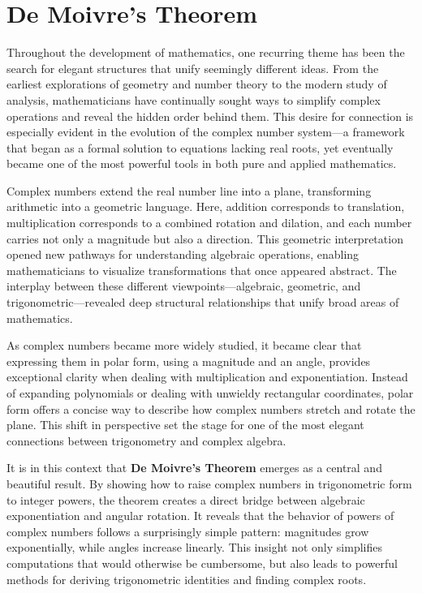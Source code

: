 \chapter{De Moivre's Theorem}

Throughout the development of mathematics, one recurring theme has been the search for elegant structures
that unify seemingly different ideas. From the earliest explorations of geometry and number theory to the
modern study of analysis, mathematicians have continually sought ways to simplify complex operations and
reveal the hidden order behind them. This desire for connection is especially evident in the evolution of
the complex number system—a framework that began as a formal solution to equations lacking real roots, yet
eventually became one of the most powerful tools in both pure and applied mathematics.

Complex numbers extend the real number line into a plane, transforming arithmetic into a geometric
language. Here, addition corresponds to translation, multiplication corresponds to a combined rotation and
dilation, and each number carries not only a magnitude but also a direction. This geometric interpretation
opened new pathways for understanding algebraic operations, enabling mathematicians to visualize
transformations that once appeared abstract. The interplay between these different viewpoints—algebraic,
geometric, and trigonometric—revealed deep structural relationships that unify broad areas of mathematics.

As complex numbers became more widely studied, it became clear that expressing them in polar form, using a
magnitude and an angle, provides exceptional clarity when dealing with multiplication and
exponentiation. Instead of expanding polynomials or dealing with unwieldy rectangular coordinates, polar
form offers a concise way to describe how complex numbers stretch and rotate the plane. This shift in
perspective set the stage for one of the most elegant connections between trigonometry and complex algebra.

It is in this context that {\bf De Moivre's Theorem} emerges as a central and beautiful result. By showing how to
raise complex numbers in trigonometric form to integer powers, the theorem creates a direct bridge between
algebraic exponentiation and angular rotation. It reveals that the behavior of powers of complex numbers
follows a surprisingly simple pattern: magnitudes grow exponentially, while angles increase linearly. This
insight not only simplifies computations that would otherwise be cumbersome, but also leads to powerful
methods for deriving trigonometric identities and finding complex roots.

